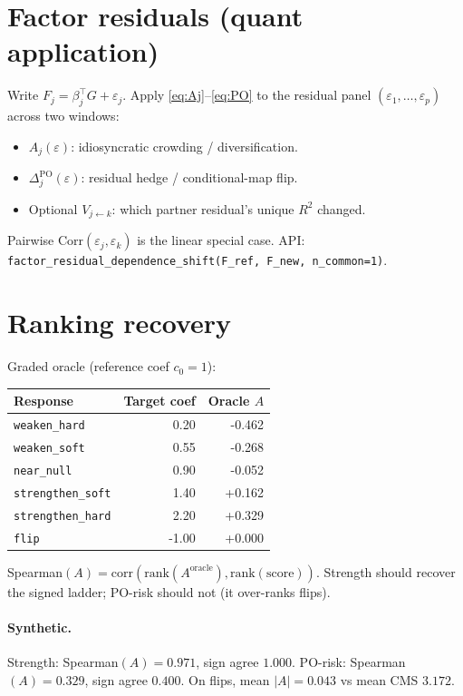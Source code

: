 \documentclass[11pt]{article}
\begin{document}
\section{Factor residuals (quant application)}

Write $F_j=\beta_j^\top G+\varepsilon_j$. Apply \eqref{eq:Aj}--\eqref{eq:PO} to the residual
panel $(\varepsilon_1,\ldots,\varepsilon_p)$ across two windows:
\begin{itemize}[leftmargin=*]
\item $A_j(\varepsilon)$: idiosyncratic crowding / diversification.
\item $\Delta^{\mathrm{PO}}_j(\varepsilon)$: residual hedge / conditional-map flip.
\item Optional $V_{j\leftarrow k}$: which partner residual's unique $R^2$ changed.
\end{itemize}
Pairwise $\mathrm{Corr}(\varepsilon_j,\varepsilon_k)$ is the linear special case.
API: \texttt{factor\_residual\_dependence\_shift(F\_ref, F\_new, n\_common=1)}.

\section{Ranking recovery}

Graded oracle (reference coef $c_0=1$):
\begin{center}
\begin{tabular}{lrr}
\toprule
Response & Target coef & Oracle $A$ \\
\midrule
\texttt{weaken\_hard} & 0.20 & -0.462 \\
\texttt{weaken\_soft} & 0.55 & -0.268 \\
\texttt{near\_null} & 0.90 & -0.052 \\
\texttt{strengthen\_soft} & 1.40 & +0.162 \\
\texttt{strengthen\_hard} & 2.20 & +0.329 \\
\texttt{flip} & -1.00 & +0.000 \\
\bottomrule
\end{tabular}
\end{center}

Spearman$(A)=\mathrm{corr}(\mathrm{rank}(A^{\mathrm{oracle}}),\mathrm{rank}(\mathrm{score}))$.
Strength should recover the signed ladder; PO-risk should not (it over-ranks flips).

\paragraph{Synthetic.}
Strength: Spearman$(A)=0.971$, sign agree $1.000$. 
PO-risk: Spearman$(A)=0.329$, sign agree $0.400$. 
On flips, mean $|A|=0.043$ vs mean CMS $3.172$.
\end{document}
